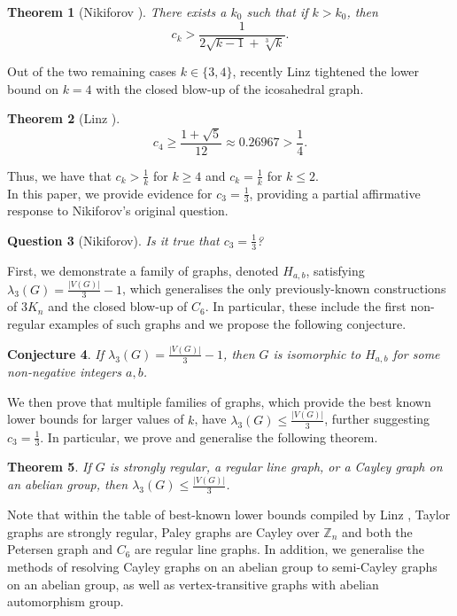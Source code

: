 \documentclass[12pt]{article}
\newtheorem{thm}{Theorem}[section]
\newtheorem{qun}[thm]{Question}
\newtheorem{conj}[thm]{Conjecture}
\begin{document}
\begin{thm}[Nikiforov \cite{NikiforovEvals}]
    There exists a $k_0$ such that if $k > k_0$, then
    \[c_k > \frac{1}{2\sqrt{k-1} + \sqrt[3]{k}}.\]
\end{thm}

Out of the two remaining cases $k \in \{3, 4\}$, recently Linz \cite{LinzImproved} tightened the lower bound on $k = 4$ with the closed blow-up of the icosahedral graph.

\begin{thm}[Linz \cite{LinzImproved}]
    \[c_4 \ge \frac{1+\sqrt{5}}{12} \approx 0.26967 > \frac14.\]
\end{thm}

Thus, we have that $c_k > \frac1k$ for $k \ge 4$ and $c_k = \frac1k$ for $k \le 2$. \\

In this paper, we provide evidence for $c_3 = \frac13$, providing a partial affirmative response to Nikiforov's original question.

\begin{qun}[Nikiforov\cite{NikiforovEvals}]\label{qun:c_3}
    Is it true that $c_3 = \frac13$?
\end{qun}

First, we demonstrate a family of graphs, denoted $H_{a,b}$, satisfying $\lambda_3(G) = \frac{|V(G)|}{3} - 1$, which generalises the only previously-known constructions of $3K_n$ and the closed blow-up of $C_6$. In particular, these include the first non-regular examples of such graphs and we propose the following conjecture.

\begin{conj}
    If $\lambda_3(G) = \frac{|V(G)|}{3} - 1$, then $G$ is isomorphic to $H_{a,b}$ for some non-negative integers $a,b$. 
\end{conj}

We then prove that multiple families of graphs, which provide the best known lower bounds for larger values of $k$, have $\lambda_3(G) \le \frac{|V(G)|}{3}$, further suggesting $c_3 = \frac13$. In particular, we prove and generalise the following theorem.

\begin{thm}\label{th:classes}
    If $G$ is strongly regular, a regular line graph, or a Cayley graph on an abelian group, then $\lambda_3(G) \le \frac{|V(G)|}{3}$. 
\end{thm}

Note that within the table of best-known lower bounds compiled by Linz \cite{LinzImproved}, Taylor graphs are strongly regular, Paley graphs are Cayley over $\mathbb{Z}_n$ and both the Petersen graph and $C_6$ are regular line graphs. In addition, we generalise the methods of resolving Cayley graphs on an abelian group to semi-Cayley graphs on an abelian group, as well as vertex-transitive graphs with abelian automorphism group. 
\end{document}
